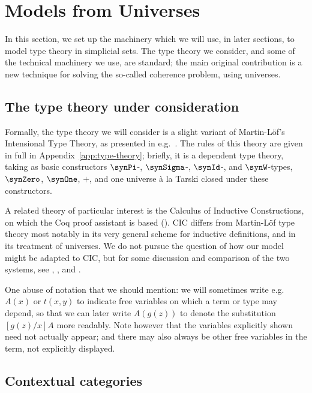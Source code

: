 
\section{Models from Universes} \label{section:models-from-universes}

In this section, we set up the machinery which we will use, in later sections, to model type theory in simplicial sets.  The type theory we consider, and some of the technical machinery we use, are standard; the main original contribution is a new technique for solving the so-called coherence problem, using universes.

\subsection{The type theory under consideration} \label{subsec:the-type-theory}

Formally, the type theory we will consider is a slight variant of Martin-Löf’s Intensional Type Theory, as presented in e.g.\ \cite{martin-lof:bibliopolis}.  The rules of this theory are given in full in Appendix~\ref{app:type-theory}; briefly, it is a dependent type theory, taking as basic constructors $\synPi$-, $\synSigma$-, $\synId$-, and $\synW$-types, $\synZero$, $\synOne$, $+$, and one universe à la Tarski closed under these constructors.

A related theory of particular interest is the Calculus of Inductive Constructions, on which the Coq proof assistant is based (\cite{werner:thesis}).  CIC differs from Martin-Löf type theory most notably in its very general scheme for inductive definitions, and in its treatment of universes.  We do not pursue the question of how our model might be adapted to CIC, but for some discussion and comparison of the two systems, see  \cite{paulin-mohring:habilitation}, \cite{barras:habilitation}, and \cite[6.2]{voevodsky:notes-on-type-systems}.

One abuse of notation that we should mention: we will sometimes write e.g.\ $A(x)$ or $t(x,y)$ to indicate free variables on which a term or type may depend, so that we can later write $A(g(z))$ to denote the substitution $[g(z)/x]A$ more readably.  Note however that the variables explicitly shown need not actually appear; and there may also always be other free variables in the term, not explicitly displayed.

\subsection{Contextual categories} \label{subsec:contextual-cats}

